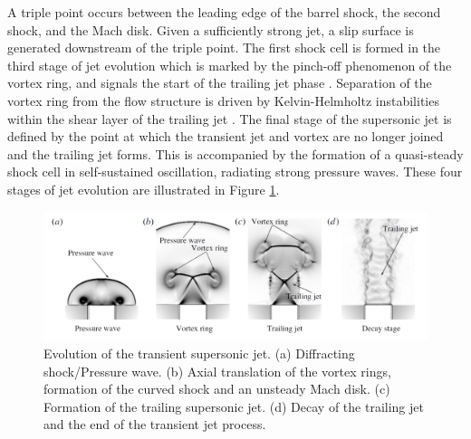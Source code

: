 A triple point occurs between the leading edge of the barrel shock, the second shock, and the Mach disk. Given a sufficiently strong jet, a slip surface is generated downstream of the triple point. The first shock cell is formed in the third stage of jet evolution which is marked by the pinch-off phenomenon of the vortex ring, and signals the start of the trailing jet phase \cite{gharib1998universal}. Separation of the vortex ring from the flow structure is driven by Kelvin-Helmholtz instabilities within the shear layer of the trailing jet \cite{zhao2000effects}. The final stage of the supersonic jet is defined by the point at which the transient jet and vortex are no longer joined and the trailing jet forms. This is accompanied by the formation of a quasi-steady shock cell in self-sustained oscillation, radiating strong pressure waves. These four stages of jet evolution are illustrated in Figure \ref{fig:2}.
\begin{figure}[h] 
	\centering
	\includegraphics[width=1\textwidth]{fig2.png} 
	\caption{Evolution of the transient supersonic jet. (a) Diffracting shock/Pressure
		wave. (b) Axial translation of the vortex rings, formation of the curved shock and an unsteady Mach disk. (c) Formation of the trailing supersonic jet. (d) Decay of the trailing jet and the end of the transient jet
		process. \cite{fernandez2017compressible}}
	\label{fig:2}
\end{figure}

